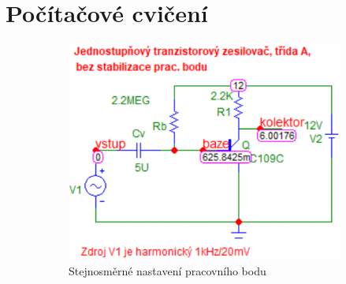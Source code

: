 \documentclass{article}
\begin{document}
\section{Počítačové cvičení}
\begin{figure}[H]
	\begin{minipage}[t]{0.45\textwidth}
    \vspace{-5mm}
    \begin{figure}[H]
      \includegraphics[width=\textwidth]{PC/BJT/prac_bod.png}
      \caption{\label{prac_bod_sim_1} Stejnosměrné nastavení pracovního bodu}
    \end{figure}
  \end{minipage}
  \hfill
  \begin{minipage}[t]{0.45\textwidth}
    \begin{figure}[H]

\end{figure}
\end{minipage}
\end{figure}
\end{document}
